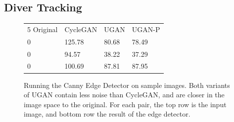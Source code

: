 \documentclass[conference,reqno]{IEEEtran}
\begin{document}
\subsection{Diver Tracking}

\begin{figure}
\centering
\begin{tabular}{p{1.7cm} p{1.7cm} p{1.7cm} p{1.5cm}}


   5 \small{Original} & \small{CycleGAN} & \small{UGAN} & \small{UGAN-P} \\

   0 & \small{125.78} & \small{80.68} & \small{78.49} \\

   0 & \small{94.57} & \small{38.22} & \small{37.29} \\

   0 & \small{100.69} & \small{87.81} & \small{87.95} \\
   
\end{tabular}
\caption{Running the Canny Edge Detector on sample images. Both variants of UGAN contain less noise than CycleGAN,
and are closer in the image space to the original. For each pair, the top row is the input image, and bottom row
the result of the edge detector.}
\end{figure}
\end{document}
